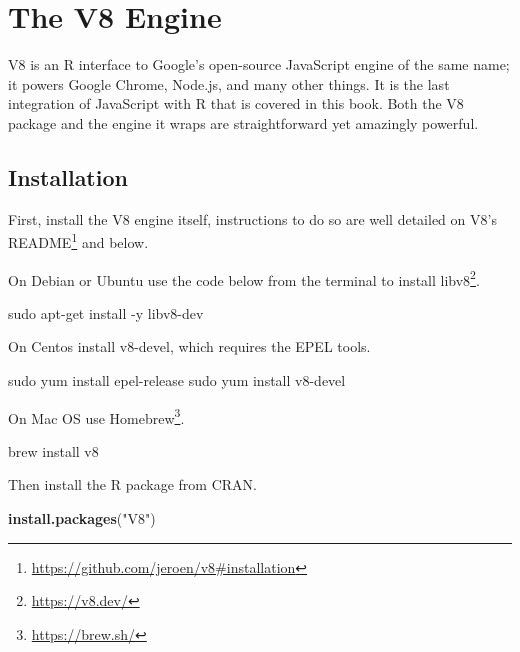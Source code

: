 \documentclass[10pt,]{krantz}
\makeatletter
\newenvironment{Shaded}{\begin{snugshade}}{\end{snugshade}}
\newcommand{\ExtensionTok}[1]{#1}
\newcommand{\FunctionTok}[1]{\textcolor[rgb]{0,0,0}{#1}}
\newcommand{\KeywordTok}[1]{\textcolor[rgb]{0.27,0.27,0.27}{\textbf{#1}}}
\newcommand{\NormalTok}[1]{#1}
\newcommand{\StringTok}[1]{\textcolor[rgb]{0.5,0.5,0.5}{#1}}
\renewcommand{\href}[2]{#2\footnote{\url{#1}}}
\newenvironment{kframe}{%
\medskip{}
\setlength{\fboxsep}{.8em}
 \def\at@end@of@kframe{}%
 \ifinner\ifhmode%
  \def\at@end@of@kframe{\end{minipage}}%
  \begin{minipage}{\columnwidth}%
 \fi\fi%
 \def\FrameCommand##1{\hskip\@totalleftmargin \hskip-\fboxsep
 \colorbox{shadecolor}{##1}\hskip-\fboxsep
     \hskip-\linewidth \hskip-\@totalleftmargin \hskip\columnwidth}%
 \MakeFramed {\advance\hsize-\width
   \@totalleftmargin\z@ \linewidth\hsize
   \@setminipage}}%
 {\par\unskip\endMakeFramed%
 \at@end@of@kframe}
\renewenvironment{Shaded}{\begin{kframe}}{\end{kframe}}
\makeatother
\begin{document}
\hypertarget{v8}{%
\chapter{The V8 Engine}\label{v8}}

V8 is an R interface to Google's open-source JavaScript engine of the same name; it powers Google Chrome, Node.js, and many other things. It is the last integration of JavaScript with R that is covered in this book. Both the V8 package and the engine it wraps are straightforward yet amazingly powerful.

\hypertarget{v8-installation}{%
\section{Installation}\label{v8-installation}}

First, install the V8 engine itself, instructions to do so are well detailed on \href{https://github.com/jeroen/v8\#installation}{V8's README} and below.

On Debian or Ubuntu use the code below from the terminal to install \href{https://v8.dev/}{libv8}.

\begin{Shaded}
\begin{Highlighting}[]
\FunctionTok{sudo}\NormalTok{ apt-get install -y libv8-dev}
\end{Highlighting}
\end{Shaded}

On Centos install v8-devel, which requires the EPEL tools.

\begin{Shaded}
\begin{Highlighting}[]
\FunctionTok{sudo}\NormalTok{ yum install epel-release}
\FunctionTok{sudo}\NormalTok{ yum install v8-devel}
\end{Highlighting}
\end{Shaded}

On Mac OS use \href{https://brew.sh/}{Homebrew}.

\begin{Shaded}
\begin{Highlighting}[]
\ExtensionTok{brew}\NormalTok{ install v8}
\end{Highlighting}
\end{Shaded}

Then install the R package from CRAN.

\begin{Shaded}
\begin{Highlighting}[]
\KeywordTok{install.packages}\NormalTok{(}\StringTok{"V8"}\NormalTok{)}
\end{Highlighting}
\end{Shaded}
\end{document}
